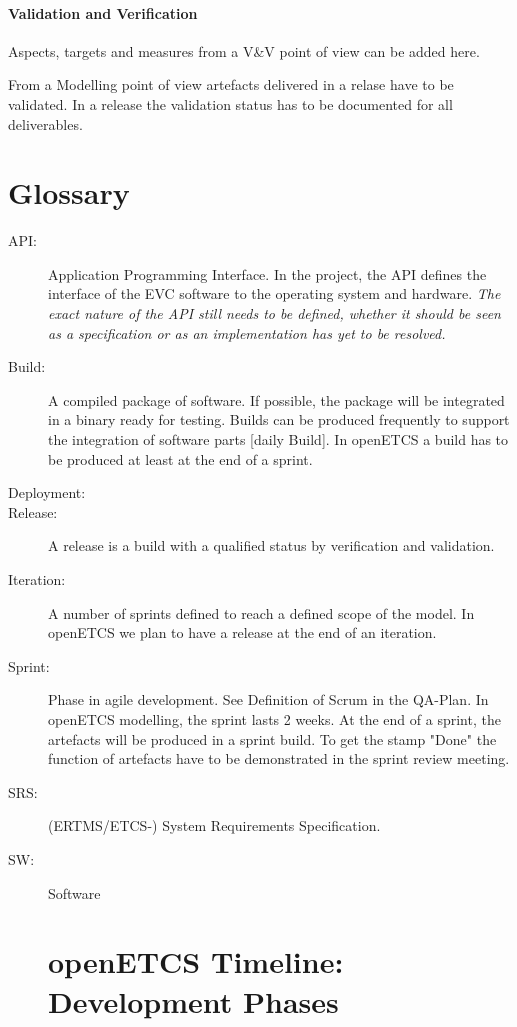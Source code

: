 \documentclass{template/openetcs_report}
\begin{document}
\paragraph{Validation and Verification}
Aspects, targets and measures from a V\&V point of view can be added here.

From a Modelling point of view artefacts delivered in a relase have to be validated. In a release the validation status has to be documented for all deliverables.

\section{Glossary}
\label{sec:glossary}

\begin{description}
\item[API:] Application Programming Interface. In the project, the API defines 
the interface of the EVC software to the operating system and hardware. \textit{The
exact nature of the API still needs to be defined, whether it should be seen as
a specification or as an implementation has yet to be resolved.}
\item[Build:] A compiled package of software. If possible, the package will be integrated in a binary ready for testing. Builds can be produced frequently to support the integration of software parts [daily Build]. In openETCS a build has to be produced at least at the end of a sprint.
\item[Deployment:]
\item[Release:] A release is a build with a qualified status by verification and validation.
\item[Iteration:] A number of sprints defined to reach a defined scope of the model. In openETCS we plan to have a release at the end of an iteration.
\item[Sprint:] Phase in agile development. See Definition of Scrum in the QA-Plan. In openETCS modelling, the sprint lasts 2 weeks. At the end of a sprint, the artefacts will be produced in a sprint build. To get the stamp "Done" the function of artefacts have to be demonstrated in the sprint review meeting.
\item[SRS:] (ERTMS/ETCS-) System Requirements Specification. 
\item[SW:] Software



\section{openETCS Timeline: Development Phases}


\end{description}
\end{document}
